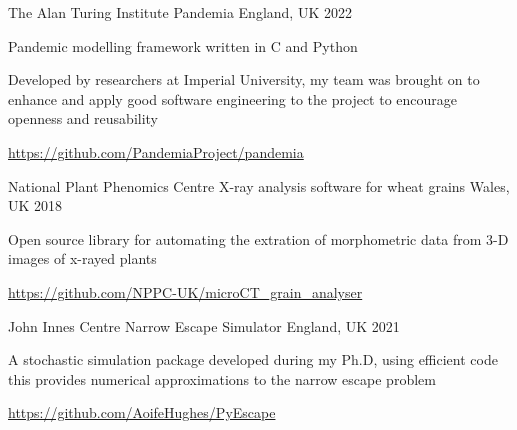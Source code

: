 

\begin{cventries}

  \cventry
    {The Alan Turing Institute} %
    {Pandemia} %
    {England, UK} %
    {2022} %
    {
      \begin{cvitems} %
        \item {Pandemic modelling framework written in C and Python}
        \item {Developed by researchers at Imperial University, my team was brought on to enhance and apply good software engineering to the project to encourage openness and reusability}
        \item {\url{https://github.com/PandemiaProject/pandemia}}
      \end{cvitems}
    }

  \cventry
    {National Plant Phenomics Centre} %
    {X-ray analysis software for wheat grains} %
    {Wales, UK} %
    {2018} %
    {
      \begin{cvitems} %
        \item {Open source library for automating the extration of morphometric data from 3-D images of x-rayed plants}
        \item {\url{https://github.com/NPPC-UK/microCT_grain_analyser} }
      \end{cvitems}
    }


  \cventry
    {John Innes Centre} %
    {Narrow Escape Simulator} %
    {England, UK} %
    {2021} %
    {
      \begin{cvitems} %
        \item {A stochastic simulation package developed during my Ph.D, using efficient code this provides numerical approximations to the narrow escape problem}
        \item {\url{https://github.com/AoifeHughes/PyEscape}}
      \end{cvitems}
    }


\end{cventries}
